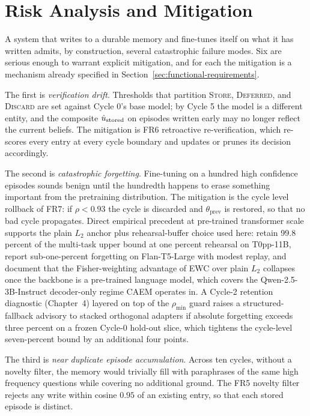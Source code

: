 \section{Risk Analysis and Mitigation}
\label{sec:risks}

A system that writes to a durable memory and fine-tunes itself on what it has written admits, by construction, several catastrophic failure modes. Six are serious enough to warrant explicit mitigation, and for each the mitigation is a mechanism already specified in Section~\ref{sec:functional-requirements}.

The first is \emph{verification drift}. Thresholds that partition \textsc{Store}, \textsc{Deferred}, and \textsc{Discard} are set against Cycle 0's base model; by Cycle 5 the model is a different entity, and the composite $\hat{u}_{\text{stored}}$ on episodes written early may no longer reflect the current beliefs. The mitigation is FR6 retroactive re-verification, which re-scores every entry at every cycle boundary and updates or prunes its decision accordingly.

The second is \emph{catastrophic forgetting}. Fine-tuning on a hundred high confidence episodes sounds benign until the hundredth happens to erase something important from the pretraining distribution. The mitigation is the cycle level rollback of FR7: if $\rho < 0.93$ the cycle is discarded and $\theta_{\mathrm{prev}}$ is restored, so that no bad cycle propagates. Direct empirical precedent at pre-trained transformer scale supports the plain $L_2$ anchor plus rehearsal-buffer choice used here: \citet{scialom2022fine} retain 99.8 percent of the multi-task upper bound at one percent rehearsal on T0pp-11B, \citet{jin2024forget} report sub-one-percent forgetting on Flan-T5-Large with modest replay, and \citet{mehta2023empirical} document that the Fisher-weighting advantage of EWC over plain $L_2$ collapses once the backbone is a pre-trained language model, which covers the Qwen-2.5-3B-Instruct decoder-only regime CAEM operates in. A Cycle-2 retention diagnostic (Chapter~4) layered on top of the $\rho_{\min}$ guard raises a structured-fallback advisory to stacked orthogonal adapters \citep{wang2023olora,biderman2024lora} if absolute forgetting exceeds three percent on a frozen Cycle-0 hold-out slice, which tightens the cycle-level seven-percent bound by an additional four points.

The third is \emph{near duplicate episode accumulation}. Across ten cycles, without a novelty filter, the memory would trivially fill with paraphrases of the same high frequency questions while covering no additional ground. The FR5 novelty filter rejects any write within cosine $0.95$ of an existing entry, so that each stored episode is distinct.

